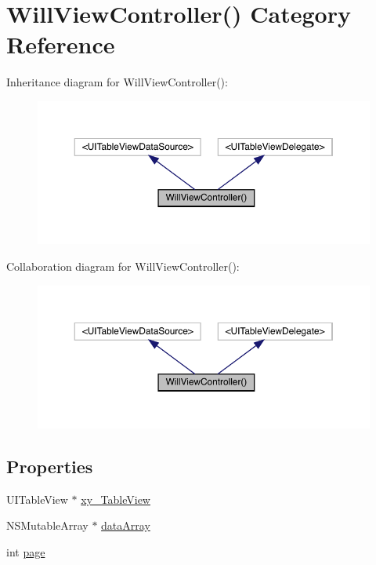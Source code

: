 \hypertarget{category_will_view_controller_07_08}{}\section{Will\+View\+Controller() Category Reference}
\label{category_will_view_controller_07_08}


Inheritance diagram for Will\+View\+Controller()\+:\nopagebreak
\begin{figure}[H]
\begin{center}
\leavevmode
\includegraphics[width=350pt]{category_will_view_controller_07_08__inherit__graph}
\end{center}
\end{figure}


Collaboration diagram for Will\+View\+Controller()\+:\nopagebreak
\begin{figure}[H]
\begin{center}
\leavevmode
\includegraphics[width=350pt]{category_will_view_controller_07_08__coll__graph}
\end{center}
\end{figure}
\subsection*{Properties}
\begin{DoxyCompactItemize}
\item 
U\+I\+Table\+View $\ast$ \mbox{\hyperlink{category_will_view_controller_07_08_a29970543987b41feb34fcd8e248f8bd7}{xy\+\_\+\+Table\+View}}
\item 
N\+S\+Mutable\+Array $\ast$ \mbox{\hyperlink{category_will_view_controller_07_08_a033382ebd3bad4fa1d6a2c885cc72d48}{data\+Array}}
\item 
int \mbox{\hyperlink{category_will_view_controller_07_08_a07c6f61a8d3f7e267b49b7cfca1ecb0d}{page}}
\end{DoxyCompactItemize}


